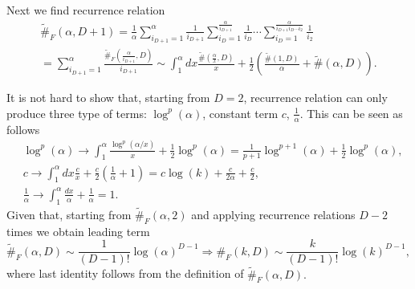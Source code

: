 \documentclass{article}
\begin{document}
Next we find recurrence relation
\begin{multline}
	\widetilde{\#}_{F}(\alpha, D+1) =  \frac{1}{\alpha}\sum_{i_{D+1}=1}^{\alpha} \frac{1}{i_{D+1}} \sum_{i_{D} = 1}^{\frac{\alpha}{i_{D+1}}} \frac{1}{i_{D}} \cdots \sum_{i_{D} = 1}^{\frac{\alpha}{i_{D+1} i_{D}\cdots i_{2}}} \frac{1}{i_{2}}\\ = \sum_{i_{D+1}=1}^{\alpha} \frac{\widetilde{\#}_{F}\left(\frac{\alpha}{i_{D+1}}, D\right)}{i_{D+1}} \sim \int_{1}^{\alpha} dx \frac{\widetilde{\#}\left(\frac{\alpha}{x}, D\right)}{x} + \frac{1}{2}\left(\frac{\widetilde{\#}\left(1, D\right)}{\alpha} + \widetilde{\#}\left(\alpha, D\right)\right).
\end{multline}

It is not hard to show that, starting from $D=2$, recurrence relation can only produce three type of terms: $\log^{p}(\alpha)$, constant term $c$, $\frac{1}{\alpha}$. This can be seen as follows
\begin{equation}
	\begin{split}
		&\log^{p}(\alpha) \rightarrow \int_{1}^{\alpha} \frac{\log^{p}(\alpha/x)}{x} + \frac{1}{2}\log^{p}(\alpha) = \frac{1}{p+1}\log^{p+1}(\alpha) + \frac{1}{2}\log^{p}(\alpha),\\
		&c \rightarrow \int_{1}^{\alpha} dx \frac{c}{x} + \frac{c}{2}\left(\frac{1}{\alpha} + 1\right) = c\log(k) + \frac{c}{2\alpha} + \frac{c}{2},\\
		&\frac{1}{\alpha}\rightarrow \int_{1}^{\alpha} \frac{dx}{\alpha} + \frac{1}{\alpha} = 1.
	\end{split}
\end{equation}
Given that, starting from $\widetilde{\#}_{F}(\alpha, 2)$ and applying recurrence relations $D-2$ times we obtain leading term
\begin{equation}
	\widetilde{\#}_{F}(\alpha, D) \sim \frac{1}{(D-1)!}\log(\alpha)^{D-1} \Rightarrow \#_{F}(k, D) \sim \frac{k}{(D-1)!}\log(k)^{D-1},
\end{equation}
where last identity follows from the definition of $\widetilde{\#}_{F}(\alpha, D).$
\end{document}
